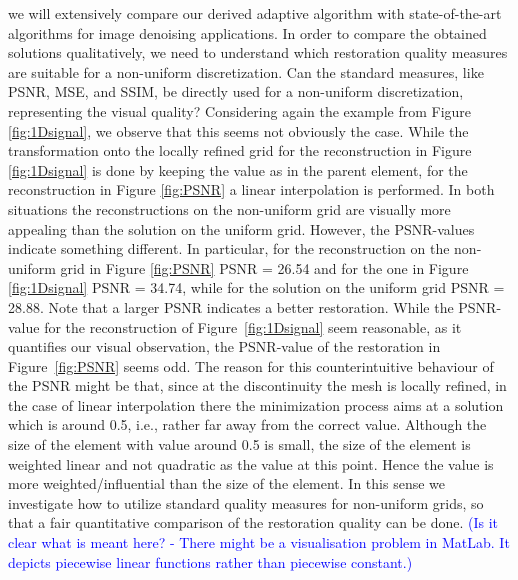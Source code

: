 \documentclass[enabledeprecatedfontcommands,cleardoublepage=empty,headsepline,twoside,11pt,DIV=15,BCOR=12mm,final]{scrartcl}
\begin{document}
 we will extensively compare our derived adaptive algorithm with state-of-the-art algorithms for image denoising applications. In order to compare the obtained solutions qualitatively, we need to understand which restoration quality measures are suitable for a non-uniform discretization. Can the standard measures, like PSNR, MSE, and SSIM, be directly used for a non-uniform discretization, representing the visual quality? Considering again the example from Figure \ref{fig:1Dsignal}, we observe that this seems not obviously the case. While the transformation onto the locally refined grid for the reconstruction in Figure \ref{fig:1Dsignal} is done by keeping the value as in the parent element, for the reconstruction in Figure \ref{fig:PSNR} a linear interpolation is performed. In both situations the reconstructions on the non-uniform grid are visually more appealing than the solution on the uniform grid. However, the PSNR-values indicate something different. In particular, for the reconstruction on the non-uniform grid in Figure \ref{fig:PSNR} PSNR = 26.54 and for the one in Figure \ref{fig:1Dsignal} PSNR = 34.74, while for the solution on the uniform grid PSNR = 28.88. Note that a larger PSNR indicates a better restoration. While the PSNR-value for the reconstruction of Figure~\ref{fig:1Dsignal} seem reasonable, as it quantifies our visual observation, the PSNR-value of the restoration in Figure~\ref{fig:PSNR} seems odd. The reason for this counterintuitive behaviour of the PSNR might be that, since at the discontinuity the mesh is locally refined, in the case of linear interpolation there the minimization process aims at a solution which is around 0.5, i.e., rather far away from the correct value. Although the size of the element with value around 0.5 is small, the size of the element is weighted linear and not quadratic as the value at this point. Hence the value is more weighted/influential than the size of the element. In this sense we investigate how to utilize standard quality measures for non-uniform grids, so that a fair quantitative comparison of the restoration quality can be done. \textcolor{blue}{(Is it clear what is meant here? - There might be a visualisation problem in MatLab. It depicts piecewise linear functions rather than piecewise constant.)}
 
 
\end{document}
